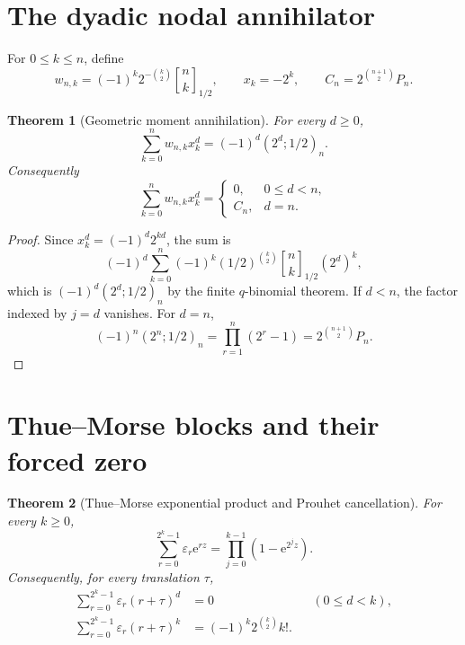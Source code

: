 \documentclass[11pt,oneside,openany]{book}
\newtheorem{theorem}{Theorem}[chapter]
\theoremstyle{definition}
\theoremstyle{remark}
\newcommand{\Qbinom}[3]{\genfrac{[}{]}{0pt}{}{#1}{#2}_{#3}}
\newcommand{\e}{\mathrm e}
\begin{document}
\section{The dyadic nodal annihilator}

For $0\le k\le n$, define
\begin{equation}
 w_{n,k}=(-1)^k2^{-\binom k2}\Qbinom nk{1/2},
 \qquad x_k=-2^k,
 \qquad C_n=2^{\binom{n+1}{2}}P_n.
 \label{eq:fq-weights-nodes}
\end{equation}

\begin{theorem}[Geometric moment annihilation]
\label{thm:fq-geometric-annihilation}
For every $d\ge0$,
\begin{equation}
 \sum_{k=0}^{n}w_{n,k}x_k^d
 =(-1)^d(2^d;1/2)_n.
 \label{eq:fq-moment-product}
\end{equation}
Consequently
\begin{equation}
 \sum_{k=0}^{n}w_{n,k}x_k^d=
 \begin{cases}
 0,&0\le d<n,\\
 C_n,&d=n.
 \end{cases}
 \label{eq:fq-moment-annihilation}
\end{equation}
\end{theorem}

\begin{proof}
Since $x_k^d=(-1)^d2^{kd}$, the sum is
\[
 (-1)^d\sum_{k=0}^{n}(-1)^k
 (1/2)^{\binom k2}\Qbinom nk{1/2}(2^d)^k,
\]
which is $(-1)^d(2^d;1/2)_n$ by the finite $q$-binomial theorem.  If $d<n$,
the factor indexed by $j=d$ vanishes.  For $d=n$,
\[
 (-1)^n(2^n;1/2)_n
 =\prod_{r=1}^{n}(2^r-1)
 =2^{\binom{n+1}{2}}P_n.
\]
\end{proof}

\section{Thue--Morse blocks and their forced zero}

\begin{theorem}[Thue--Morse exponential product and Prouhet cancellation]
\label{thm:fq-TM-product}
For every $k\ge0$,
\begin{equation}
 \sum_{r=0}^{2^k-1}\varepsilon_r\e^{rz}
 =\prod_{j=0}^{k-1}(1-\e^{2^jz}).
 \label{eq:fq-TM-product}
\end{equation}
Consequently, for every translation $\tau$,
\begin{align}
 \sum_{r=0}^{2^k-1}\varepsilon_r(r+\tau)^d&=0
 &&(0\le d<k),
 \label{eq:fq-Prouhet-zero}\\
 \sum_{r=0}^{2^k-1}\varepsilon_r(r+\tau)^k
 &=(-1)^k2^{\binom k2}k!.
 \label{eq:fq-Prouhet-top}
\end{align}
\end{theorem}
\end{document}
